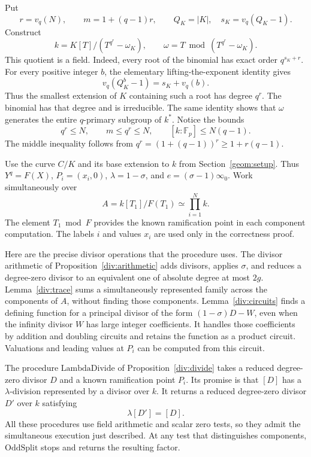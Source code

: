 Put
\begin{equation}
             r=v_q(N),\qquad m=1+(q-1)r,
             \qquad Q_K=|K|,\quad s_K=v_q(Q_K-1).
\label{odd:parameters}
\end{equation}
Construct
\begin{equation}
             k=K[T]/(T^{q^r}-\omega_K),
             \qquad \omega=T\bmod(T^{q^r}-\omega_K).
\label{odd:working-field}
\end{equation}
This quotient is a field.  Indeed, every root of the binomial has exact
order $q^{s_K+r}$.  For every positive integer $b$, the elementary
lifting-the-exponent identity gives
\[
                  v_q(Q_K^b-1)=s_K+v_q(b).
\]
Thus the smallest extension of $K$ containing such a root has degree
$q^r$.  The binomial has that degree and is irreducible.
The same identity shows that $\omega$ generates the entire $q$-primary
subgroup of $k^*$.
Notice the bounds
\begin{equation}
                 q^r\le N,\qquad m\le q^r\le N,
                 \qquad [k:\mathbb F_p]\le N(q-1).
\label{odd:field-bounds}
\end{equation}
The middle inequality follows from
$q^r=(1+(q-1))^r\ge1+r(q-1)$.

Use the curve $C/K$ and its base extension to $k$ from
Section~\ref{geom:setup}.  Thus $Y^q=F(X)$,
$P_i=(x_i,0)$, $\lambda=1-\sigma$, and
$e=(\sigma-1)\infty_0$.  Work simultaneously over
\[
                    A=k[T_1]/F(T_1)\simeq\prod_{i=1}^N k.
\]
The element $T_1\bmod F$ provides the known ramification point in each
component computation.  The labels $i$ and values $x_i$ are used only in
the correctness proof.

Here are the precise divisor operations that the procedure uses.
The divisor arithmetic of Proposition~\ref{div:arithmetic} adds divisors,
applies $\sigma$, and reduces a degree-zero divisor to an equivalent one
of absolute degree at most $2g$.  Lemma~\ref{div:trace} sums a
simultaneously represented family across the components of $A$, without
finding those components.  Lemma~\ref{div:circuits} finds a defining
function for a principal divisor of the form $(1-\sigma)D-W$, even when
the infinity divisor $W$ has large integer coefficients.  It handles those
coefficients by addition and doubling circuits and retains the function
as a product circuit.  Valuations and leading values at $P_i$ can be
computed from this circuit.

The procedure $\mathrm{LambdaDivide}$ of
Proposition~\ref{div:divide} takes a reduced degree-zero divisor $D$
and a known ramification point $P_i$.  Its promise is that $[D]$ has a
$\lambda$-division represented by a divisor over $k$.  It returns a
reduced degree-zero divisor $D'$ over $k$ satisfying
\[
                              \lambda[D']=[D].
\]
All these procedures use field arithmetic and scalar zero tests, so they admit
the simultaneous execution just described.  At any test that distinguishes
components, $\mathrm{OddSplit}$ stops and returns the resulting factor.

